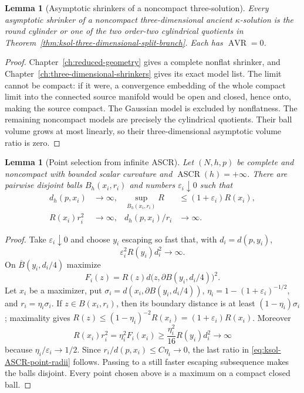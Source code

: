 \documentclass[10pt]{coll-l}
\newtheorem{lemma}[theorem]{Lemma}
\theoremstyle{definition}
\theoremstyle{remark}
\numberwithin{section}{chapter}
\numberwithin{equation}{chapter}
\newcommand{\ASCR}{\operatorname{ASCR}}
\newcommand{\AVR}{\operatorname{AVR}}
\begin{document}
\begin{lemma}[Asymptotic shrinkers of a noncompact three-solution]
\label{lem:ksol-noncompact-asymptotic-shrinker}
Every asymptotic shrinker of a noncompact three-dimensional ancient
$\kappa$-solution is the round cylinder or one of the two order-two
cylindrical quotients in Theorem~\ref{thm:ksol-three-dimensional-split-branch}.
Each has $\AVR=0$.
\end{lemma}

\begin{proof}
Chapter~\ref{ch:reduced-geometry} gives a complete nonflat shrinker, and
Chapter~\ref{ch:three-dimensional-shrinkers} gives its exact model list.
The limit cannot be compact: if it were, a convergence embedding of the
whole compact limit into the connected source manifold would be open and
closed, hence onto, making the source compact.  The Gaussian model is
excluded by nonflatness.  The remaining noncompact models are precisely
the cylindrical quotients.  Their ball volume grows at most linearly, so
their three-dimensional asymptotic volume ratio is zero.
\end{proof}

\begin{lemma}[Point selection from infinite ASCR]
\label{lem:ksol-ASCR-point-selection}
Let $(N,h,p)$ be complete and noncompact with bounded scalar curvature and
$\ASCR(h)=+\infty$.  There are pairwise disjoint balls $B_h(x_i,r_i)$ and
numbers $\varepsilon_i\downarrow0$ such that
\begin{align}
 d_h(p,x_i)&\to\infty,&
 \sup_{B_h(x_i,r_i)}R&\leq(1+\varepsilon_i)R(x_i),      \label{eq:ksol-ASCR-point-control}\\
 R(x_i)r_i^2&\to\infty,&
 d_h(p,x_i)/r_i&\to\infty.                             \label{eq:ksol-ASCR-point-radii}
\end{align}
\end{lemma}

\begin{proof}
Take $\varepsilon_i\downarrow0$ and choose $y_i$ escaping so fast that,
with $d_i=d(p,y_i)$,
\begin{equation}
               \varepsilon_i^2R(y_i)d_i^2\longrightarrow\infty.
                                                               \label{eq:ksol-ASCR-selection-rate}
\end{equation}
On $\overline B(y_i,d_i/4)$ maximize
\[
          F_i(z)=R(z)d\bigl(z,\partial B(y_i,d_i/4)\bigr)^2.
\]
Let $x_i$ be a maximizer, put
$\sigma_i=d(x_i,\partial B(y_i,d_i/4))$,
$\eta_i=1-(1+\varepsilon_i)^{-1/2}$, and
$r_i=\eta_i\sigma_i$.  If $z\in B(x_i,r_i)$, then its boundary distance is
at least $(1-\eta_i)\sigma_i$; maximality gives
$R(z)\leq(1-\eta_i)^{-2}R(x_i)=(1+\varepsilon_i)R(x_i)$.
Moreover
\[
 R(x_i)r_i^2=\eta_i^2F_i(x_i)
 \geq\frac{\eta_i^2}{16}R(y_i)d_i^2\longrightarrow\infty
\]
because $\eta_i/\varepsilon_i\to1/2$.  Since
$r_i/d(p,x_i)\leq C\eta_i\to0$, the last ratio in
\eqref{eq:ksol-ASCR-point-radii} follows.  Passing to a still faster
escaping subsequence makes the balls disjoint.  Every point chosen above is
a maximum on a compact closed ball.
\end{proof}
\end{document}
